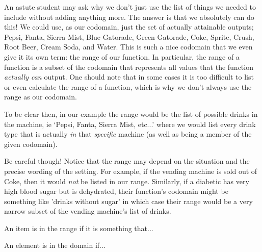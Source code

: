 \documentclass{ximera}
\begin{document}
An astute student may ask why we don't just use the list of things we needed to include without adding anything more. The answer is that we absolutely can do this! We could use, as our codomain, just the set of actually attainable outputs; Pepsi, Fanta, Sierra Mist, Blue Gatorade, Green Gatorade, Coke, Sprite, Crush, Root Beer, Cream Soda, and Water. This is such a nice codomain that we even give it its own term: the range of our function. In particular, the range of a function is a subset of the codomain that represents all values that the function \textit{actually can} output. One should note that in some cases it is too difficult to list or even calculate the range of a function, which is why we don't always use the range as our codomain.

To be clear then, in our example the range would be the list of possible drinks in the machine, ie `Pepsi, Fanta, Sierra Mist, etc...' where we would list every drink type that is actually \textit{in} that \textit{specific} machine (as well as being a member of the given codomain).

Be careful though! Notice that the range may depend on the situation and the precise wording of the setting. For example, if the vending machine is sold out of Coke, then it would \textit{not} be listed in our range. Similarly, if a diabetic has very high blood sugar but is dehydrated, their function's codomain might be something like 'drinks without sugar' in which case their range would be a very narrow subset of the vending machine's list of drinks.


\begin{question}
    An item is in the range if it is something that...
    \begin{multipleChoice}
    \end{multipleChoice}
\end{question}

\begin{question}
    An element is in the domain if...
    \begin{multipleChoice}
    \end{multipleChoice}
\end{question}
\end{document}
